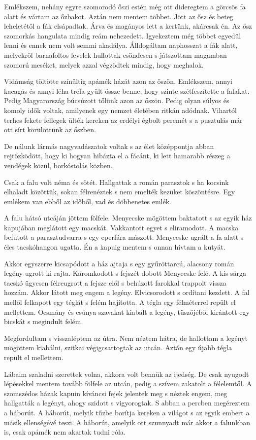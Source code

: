 \documentclass{IEEEtran}
\begin{document}
Emlékszem, nehány egyre szomorodó őszi estén még ott dideregtem a görcsös fa alatt és vártam az őzbakot. Aztán nem mentem többet. Jött az ősz és beteg leheletétől a fák elsápadtak. Árva és magányos lett a kertünk, akárcsak én. Az ősz szomorkás hangulata mindig reám nehezedett. Igyekeztem még többet egyedül lenni és ennek nem volt semmi akadálya. Álldogáltam naphosszat a fák alatt, melyekről barnafoltos levelek hullottak csöndesen s játszottam magamban szomorú meséket, melyek azzal végződtek mindig, hogy meghalok.

Vidámság töltötte színültig apámék házát azon az őszön. Emlékszem, annyi kacagás és annyi léha tréfa gyűlt össze benne, hogy szinte szétfeszítette a falakat. Pedig Magyarország búcsúzott tőlünk azon az őszön. Pedig olyan súlyos és komoly idők voltak, amilyenek egy nemzet életében ritkán adódnak. Vihartól terhes fekete fellegek ülték kereken az erdélyi égbolt peremét s a pusztulás már ott sírt körülöttünk az őszben.

De nálunk lármás nagyvadászatok voltak s az élet középpontja abban rejtőzködött, hogy ki hogyan hibázta el a fácánt, ki lett hamarabb részeg a vendégek közül, borkóstolás közben.

Csak a falu volt néma és sötét. Hallgattak a román parasztok s ha kocsink elhaladt közöttük, sokan félrenéztek s nem emelték kezüket köszöntésre. Egy emlékem van ebből az időből, vad és döbbenetes emlék.

A falu hátsó utcáján jöttem fölfele. Menyecske mögöttem baktatott s az egyik ház kapujában meglátott egy macskát. Vakkantott egyet s eliramodott. A macska befutott a parasztudvarra s egy eperfára mászott. Menyecske ugrált a fa alatt s éles tacskóhangon ugatta. Én a kapuig mentem s onnan hívtam a kutyát.

Akkor egyszerre kicsapódott a ház ajtaja s egy gyűröttarcú, alacsony román legény ugrott ki rajta. Káromkodott s fejszét dobott Menyecske felé. A kis sárga tacskó ügyesen félreugrott a fejsze elől s behúzott farokkal trappolt vissza hozzám. Akkor látott meg engem a legény. Elvicsorodott s ordítani kezdett. A fal mellől felkapott egy téglát s felém hajította. A tégla egy félméterrel repült el mellettem. Ocsmány és csúnya szavakat kiabált a legény, tüszőjéből kirántott egy bicskát s megindult felém.

Megfordultam s visszaléptem az útra. Nem néztem hátra, de hallottam a legényt mögöttem kiabálni, szitkai végigcsattogtak az utcán. Aztán egy újabb tégla repült el mellettem.

Lábaim szaladni szerettek volna, akkora volt bennük az ijedség. De csak nyugodt lépésekkel mentem tovább fölfele az utcán, pedig a szívem zakatolt a félelemtől. A szomszédos házak kapuin kíváncsi fejek jelentek meg s néztek engem, meg hallgatták a legényt, ahogy szidott s vigyorogtak. S abban a percben megéreztem a háborút. A háborút, melyik tűzbe borítja kereken a világot s az egyik embert a másik ellenségévé teszi. A háborút, amelyik ott szunnyadt már akkor a falunkban is, csak apámék nem akartak tudni róla.
\end{document}
